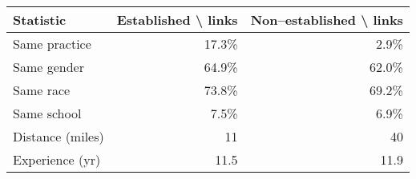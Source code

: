 \begin{table}[!h]
\centering
\begin{tabular}{lrr}
\toprule
Statistic & Established \textbackslash{} links & Non--established \textbackslash{} links\\
\midrule
Same practice & 17.3\% & 2.9\%\\
Same gender & 64.9\% & 62.0\%\\
Same race & 73.8\% & 69.2\%\\
Same school & 7.5\% & 6.9\%\\
Distance (miles) & 11 & 40\\
\addlinespace
Experience (yr) & 11.5 & 11.9\\
\bottomrule
\end{tabular}
\end{table}
